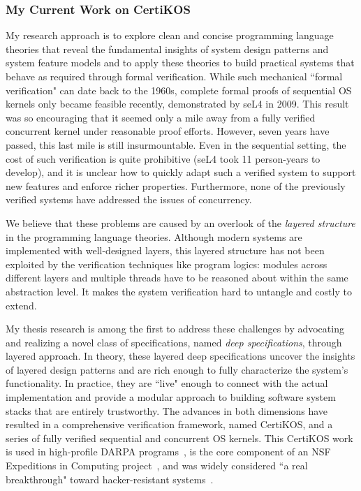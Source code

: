 \documentclass[a4paper, 10pt]{article}
\begin{document}
\begin{small}

\subsubsection*{\large My Current Work on CertiKOS}

My research approach  is to explore clean and concise
programming language theories that 
reveal the fundamental insights of system design patterns
and system feature models and to apply these theories
to build practical systems that behave as required
through formal verification. 
While such mechanical ``formal verification" can date back to the 1960s, 
complete formal proofs of sequential OS kernels only became feasible recently, demonstrated by seL4 in 2009. This result was so encouraging that it seemed only a mile away from a fully verified concurrent kernel under reasonable proof efforts. However, 
seven years have passed,
this last mile is still insurmountable.
Even in the sequential setting, the cost of such verification is quite prohibitive
(seL4 took 11 person-years to develop), and
 it is unclear how to quickly adapt such a verified system to support new features and enforce richer properties. 
Furthermore, none of the previously verified systems have addressed the
issues of concurrency.

 
We believe that these problems
are caused by an overlook of the \emph{layered structure} in the programming language theories.
Although modern systems are implemented with
well-designed layers, this layered structure has not been exploited by the verification techniques like program logics:  modules across different layers and multiple threads have to be reasoned about within 
the same abstraction level. It makes the system verification
hard to untangle
and costly to extend.

My thesis research is among the first to address these challenges
by advocating and realizing a novel class of specifications, named \emph{deep specifications}, through layered approach.
In theory, these layered deep specifications uncover the 
insights of  layered design patterns
and are rich
enough to fully characterize the system's functionality. In practice, they are ``live" enough to  connect   with the actual  implementation and provide a modular approach to building
 software system stacks that are entirely trustworthy.
The advances in both dimensions have resulted in a comprehensive
verification framework, named CertiKOS, and
a series of fully verified sequential and concurrent OS kernels.
This CertiKOS work is used in high-profile DARPA programs~\cite{crash,hacms},
is the core component of an NSF Expeditions in Computing project~\cite{deepspec}, and was widely considered
 ``a real breakthrough" toward hacker-resistant systems~\cite{news, times, dnews}.



\end{small}
\end{document}
